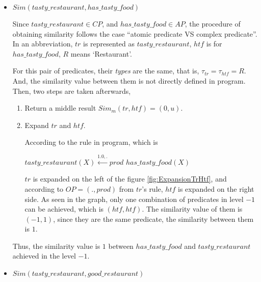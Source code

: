 \begin{itemize}
 \item $Sim(tasty\_restaurant,has\_tasty\_food)$

Since $tasty\_restaurant \in CP$, and $has\_tasty\_food \in AP$, the procedure of obtaining similarity follows the case ``atomic predicate VS complex predicate''.
In an abbreviation, $tr$ is represented as $tasty\_restaurant$, $htf$ is for $has\_tasty\_food$, $R$ means `Restaurant'.
\newpage

For this pair of predicates, their \textit{types} are the same, that is, $\tau_{tr}=\tau_{htf}=R$. And, the similarity value between them is not directly defined in program. Then, two steps are taken afterwards,
\begin{enumerate}
 \item Return a middle result $Sim_{m}(tr,htf)=(0,u)$.
 \item Expand $tr$ and $htf$.     
 	 
       According to the rule in program, which is 
       \begin{center}
         $tasty\_restaurant(X) \stackrel{1.0,.}{\longleftarrow} prod$ $has\_tasty\_food(X)$
       \end{center}
       $tr$ is expanded on the left of the figure \ref{fig:ExpansionTrHtf}, and according to $OP=(.,prod)$ from $tr$'s rule, $htf$ is expanded on the right side. As seen in the graph, only one combination of predicates in level $-1$ can be achieved, which is $(htf, htf)$. The similarity value of them is $(-1,1)$, since they are the same predicate, the similarity between them is $1$.  
\end{enumerate}
Thus, the similarity value is $1$ between $has\_tasty\_food$ and $tasty\_restaurant$ achieved in the level $-1$.

 \item $Sim(tasty\_restaurant,good\_restaurant)$
 

\end{itemize}
